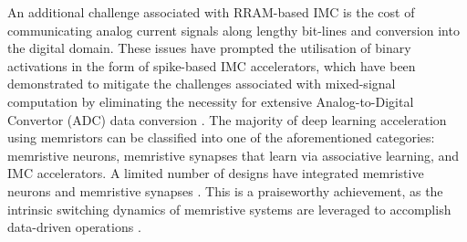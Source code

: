 

\noindent An additional challenge associated with RRAM-based IMC is the cost of communicating analog current signals along lengthy bit-lines and conversion into the digital domain. These issues have prompted the utilisation of binary activations in the form of spike-based IMC accelerators, which have been demonstrated to mitigate the challenges associated with mixed-signal computation by eliminating the necessity for extensive Analog-to-Digital Convertor (ADC) data conversion \cite{eshraghian2022memristor}. The majority of deep learning acceleration using memristors can be classified into one of the aforementioned categories: memristive neurons, memristive synapses that learn via associative learning, and IMC accelerators. A limited number of designs have integrated memristive neurons and memristive synapses \cite{wang2018fully}. This is a praiseworthy achievement, as the intrinsic switching dynamics of memristive systems are leveraged to accomplish data-driven operations \cite{tang2020fully}. \\


